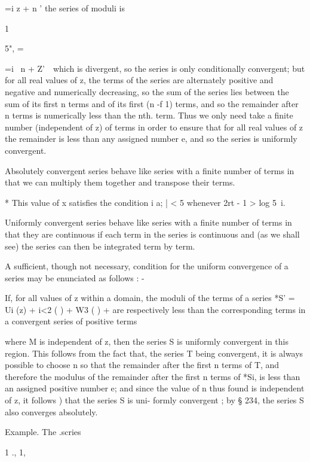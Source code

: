  =i z + n ' the series of moduli is

1

5", =

 =i \ n + Z'\ \ which is divergent, so the series is only
conditionally convergent; but for all real values of z, the terms of
the series are alternately positive and negative and numerically
decreasing, so the sum of the series lies between the sum of its first
n terms and of its first (n -f 1) terms, and so the remainder after n
terms is numerically less than the nth. term. Thus we only need take a
finite number (independent of z) of terms in order to ensure that for
all real values of z the remainder is less than any assigned number e,
and so the series is uniformly convergent.

Absolutely convergent series behave like series with a finite number
of terms in that we can multiply them together and transpose their
terms.

* This value of x satisfies the condition i a; | < 5 whenever 2rt - 1
> log 5~i.

%
%

Uniformly convergent series behave like series with a finite number of
terms in that they are continuous if each term in the series is
continuous and (as we shall see) the series can then be integrated
term by term.


A sufficient, though not necessary, condition for the uniform
convergence of a series may be enunciated as follows : -

If, for all values of z within a domain, the moduli of the terms of a
series *S' = Ui (z) + i<2 ( ) + W3 ( ) +    are respectively less
than the corresponding terms in a convergent series of positive terms

where M is independent of z, then the series S is uniformly convergent
in this region. This follows from the fact that, the series T being
convergent, it is always possible to choose n so that the remainder
after the first n terms of T, and therefore the modulus of the
remainder after the first n terms of *Si, is less than an assigned
positive number e; and since the value of n thus found is independent
of z, it follows ) that the series S is uni- formly convergent
; by § 234, the series S also converges absolutely.

Example. The .scries

1 ., 1,

